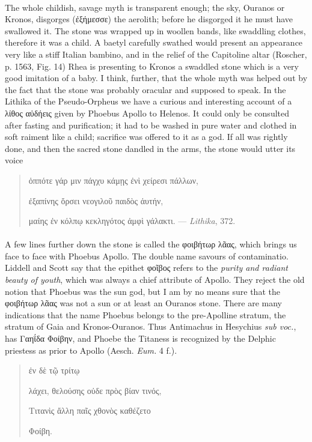 \documentclass[a4paper, 11pt, oneside, polutonikogreek, english]{article}
\begin{document}
\paragraph{}
The whole childish, savage myth is transparent enough; the sky, Ouranos or Kronos, disgorges (ἐξήμεσσε) the aerolith; before he disgorged it he must have swallowed it. The stone was wrapped up in woollen bands, like swaddling clothes, therefore it was a child. A baetyl carefully swathed would present an appearance very like a stiff Italian bambino, and in the relief of the Capitoline altar (Roscher, p. 1563, Fig. 14) Rhea is presenting to Kronos a swaddled stone which is a very good imitation of a baby. I think, further, that the whole myth was helped out by the fact that the stone was probably oracular and supposed to speak. In the Lithika of the Pseudo-Orpheus we have a curious and interesting account of a λίθος αὐδήεις given by Phoebus Apollo to Helenos. It could only be consulted after fasting and purification; it had to be washed in pure water and clothed in soft raiment like a child; sacrifice was offered to it as a god. If all was rightly done, and then the sacred stone dandled in the arms, the stone would utter its voice
\begin{quotation}
\large
ὁππότε γάρ μιν πάγχυ κάμῃς ἐνὶ χείρεσι πάλλων,

ἐξαπίνης ὄρσει νεογιλοῦ παιδὸς ἀυτήν,

μαίης ἐν κόλπῳ κεκληγότος ἀμφὶ γάλακτι. --- \emph{Lithika}, 372.
\end{quotation}
\paragraph{}
A few lines further down the stone is called the φοιβήτωρ λᾶας, which brings us face to face with Phoebus Apollo. The double name savours of contaminatio. Liddell and Scott say that the epithet φοῖβος refers to the \emph{purity and radiant beauty of youth}, which was always a chief attribute of Apollo. They reject the old notion that Phoebus was the sun god, but I am by no means sure that the φοιβήτωρ λᾶας was not a sun or at least an Ouranos stone. There are many indications that the name Phoebus belongs to the pre-Apolline stratum, the stratum of Gaia and Kronos-Ouranos. Thus Antimachus in Hesychius \emph{sub voc.}, has Γαηΐδα Φοίβην, and Phoebe the Titaness is recognized by the Delphic priestess as prior to Apollo (Aesch. \emph{Eum.} 4 f.).
\begin{quotation}
\large
\hspace*{15mm}ἐν δὲ τῷ τρίτῳ

λάχει, θελούσης οὐδε πρὸς βίαν τινός,

Τιτανὶς ἄλλη παῖς χθονὸς καθέζετο

Φοίβη.
\end{quotation}
\end{document}
